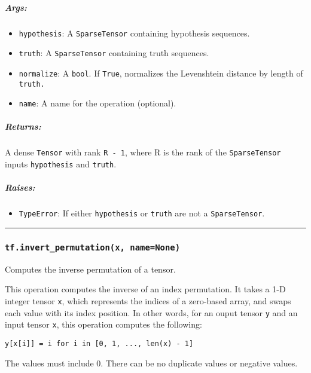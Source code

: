 \subparagraph{Args: }\label{args-59}

\begin{itemize}
\tightlist
\item
  \texttt{hypothesis}: A \texttt{SparseTensor} containing hypothesis
  sequences.
\item
  \texttt{truth}: A \texttt{SparseTensor} containing truth sequences.
\item
  \texttt{normalize}: A \texttt{bool}. If \texttt{True}, normalizes the
  Levenshtein distance by length of \texttt{truth.}
\item
  \texttt{name}: A name for the operation (optional).
\end{itemize}

\subparagraph{Returns: }\label{returns-59}

A dense \texttt{Tensor} with rank \texttt{R\ -\ 1}, where R is the rank
of the \texttt{SparseTensor} inputs \texttt{hypothesis} and
\texttt{truth}.

\subparagraph{Raises: }\label{raises-1}

\begin{itemize}
\tightlist
\item
  \texttt{TypeError}: If either \texttt{hypothesis} or \texttt{truth}
  are not a \texttt{SparseTensor}.
\end{itemize}

\begin{center}\rule{0.5\linewidth}{\linethickness}\end{center}

\subsubsection{\texorpdfstring{\texttt{tf.invert\_permutation(x,\ name=None)}
}{tf.invert\_permutation(x, name=None) }}\label{tf.invertux5fpermutationx-namenone}

Computes the inverse permutation of a tensor.

This operation computes the inverse of an index permutation. It takes a
1-D integer tensor \texttt{x}, which represents the indices of a
zero-based array, and swaps each value with its index position. In other
words, for an ouput tensor \texttt{y} and an input tensor \texttt{x},
this operation computes the following:

\texttt{y{[}x{[}i{]}{]}\ =\ i\ for\ i\ in\ {[}0,\ 1,\ ...,\ len(x)\ -\ 1{]}}

The values must include 0. There can be no duplicate values or negative
values.

